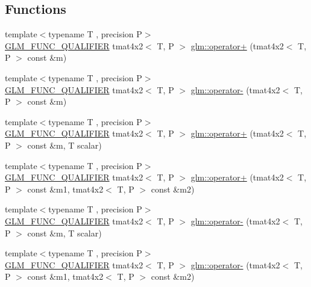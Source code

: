\subsection*{Functions}
\begin{DoxyCompactItemize}
\item 
{\footnotesize template$<$typename T , precision P$>$ }\\\mbox{\hyperlink{setup_8hpp_a33fdea6f91c5f834105f7415e2a64407}{G\+L\+M\+\_\+\+F\+U\+N\+C\+\_\+\+Q\+U\+A\+L\+I\+F\+I\+ER}} tmat4x2$<$ T, P $>$ \mbox{\hyperlink{namespaceglm_a38915d7cca65c9dd9a221de7c0b6cae2}{glm\+::operator+}} (tmat4x2$<$ T, P $>$ const \&m)
\item 
{\footnotesize template$<$typename T , precision P$>$ }\\\mbox{\hyperlink{setup_8hpp_a33fdea6f91c5f834105f7415e2a64407}{G\+L\+M\+\_\+\+F\+U\+N\+C\+\_\+\+Q\+U\+A\+L\+I\+F\+I\+ER}} tmat4x2$<$ T, P $>$ \mbox{\hyperlink{namespaceglm_ae1976eca7a3d1d7932449c25b1de40eb}{glm\+::operator-\/}} (tmat4x2$<$ T, P $>$ const \&m)
\item 
{\footnotesize template$<$typename T , precision P$>$ }\\\mbox{\hyperlink{setup_8hpp_a33fdea6f91c5f834105f7415e2a64407}{G\+L\+M\+\_\+\+F\+U\+N\+C\+\_\+\+Q\+U\+A\+L\+I\+F\+I\+ER}} tmat4x2$<$ T, P $>$ \mbox{\hyperlink{namespaceglm_a57a8bf68dc86bb3a9e84284ada45a272}{glm\+::operator+}} (tmat4x2$<$ T, P $>$ const \&m, T scalar)
\item 
{\footnotesize template$<$typename T , precision P$>$ }\\\mbox{\hyperlink{setup_8hpp_a33fdea6f91c5f834105f7415e2a64407}{G\+L\+M\+\_\+\+F\+U\+N\+C\+\_\+\+Q\+U\+A\+L\+I\+F\+I\+ER}} tmat4x2$<$ T, P $>$ \mbox{\hyperlink{namespaceglm_a6b61c12b4e0452bcbce315424bc3d58a}{glm\+::operator+}} (tmat4x2$<$ T, P $>$ const \&m1, tmat4x2$<$ T, P $>$ const \&m2)
\item 
{\footnotesize template$<$typename T , precision P$>$ }\\\mbox{\hyperlink{setup_8hpp_a33fdea6f91c5f834105f7415e2a64407}{G\+L\+M\+\_\+\+F\+U\+N\+C\+\_\+\+Q\+U\+A\+L\+I\+F\+I\+ER}} tmat4x2$<$ T, P $>$ \mbox{\hyperlink{namespaceglm_aa62b1abe3764c89c7bffbad684c7c924}{glm\+::operator-\/}} (tmat4x2$<$ T, P $>$ const \&m, T scalar)
\item 
{\footnotesize template$<$typename T , precision P$>$ }\\\mbox{\hyperlink{setup_8hpp_a33fdea6f91c5f834105f7415e2a64407}{G\+L\+M\+\_\+\+F\+U\+N\+C\+\_\+\+Q\+U\+A\+L\+I\+F\+I\+ER}} tmat4x2$<$ T, P $>$ \mbox{\hyperlink{namespaceglm_a067e8e20b493b92468065177c1439cad}{glm\+::operator-\/}} (tmat4x2$<$ T, P $>$ const \&m1, tmat4x2$<$ T, P $>$ const \&m2)

\end{DoxyCompactItemize}
